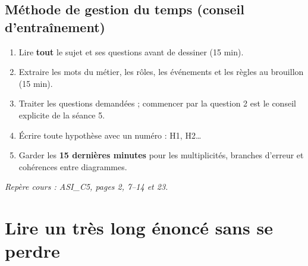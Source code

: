 \documentclass[10pt,a4paper]{article}
\newcommand{\source}[1]{\par{\footnotesize\color{bodygray}\textit{Repère cours : #1}}}
\begin{document}
\subsection{Méthode de gestion du temps (conseil d'entraînement)}
\begin{enumerate}
\item Lire \textbf{tout} le sujet et ses questions avant de dessiner (15 min).
\item Extraire les mots du métier, les rôles, les événements et les règles au brouillon (15 min).
\item Traiter les questions demandées ; commencer par la question 2 est le conseil explicite de la séance 5.
\item Écrire toute hypothèse avec un numéro : H1, H2\ldots
\item Garder les \textbf{15 dernières minutes} pour les multiplicités, branches d'erreur et cohérences entre diagrammes.
\end{enumerate}
\source{ASI\_C5, pages 2, 7--14 et 23.}

\section{Lire un très long énoncé sans se perdre}
\end{document}
